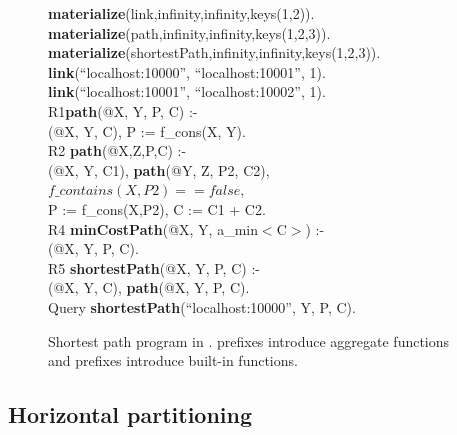 \begin{figure}
\ssp
\begin{boxedminipage}{\linewidth}
{\bf materialize}(link,infinity,infinity,keys(1,2)). \\
{\bf materialize}(path,infinity,infinity,keys(1,2,3)).  \\
{\bf materialize}(shortestPath,infinity,infinity,keys(1,2,3)). \\

{\bf link}(``localhost:10000'', ``localhost:10001'', 1). \\
{\bf link}(``localhost:10001'', ``localhost:10002'', 1). \\

R1{\bf path}(@X, Y, P, C) :- \\
(@X, Y, C), P := f\_cons(X, Y). \\

R2 {\bf path}(@X,Z,P,C) :- \\
(@X, Y, C1), {\bf path}(@Y, Z, P2, C2), \\
\datalogspace $f\_contains(X,P2) == false$, \\
\datalogspace P := f\_cons(X,P2), C := C1 + C2. \\ 

R4 {\bf minCostPath}(@X, Y, a\_min$<$C$>$) :-  \\
(@X, Y, P, C). \\

R5 {\bf shortestPath}(@X, Y, P, C) :- \\
(@X, Y, C), {\bf path}(@X, Y, P, C).\\

Query {\bf shortestPath}(``localhost:10000'', Y, P, C).
\end{boxedminipage}
\caption{\label{ch:p2:fig:overlogSP}Shortest path program in \OVERLOG. 
prefixes introduce aggregate functions and  prefixes introduce
built-in functions.}
\end{figure}

\subsection{Horizontal partitioning}

